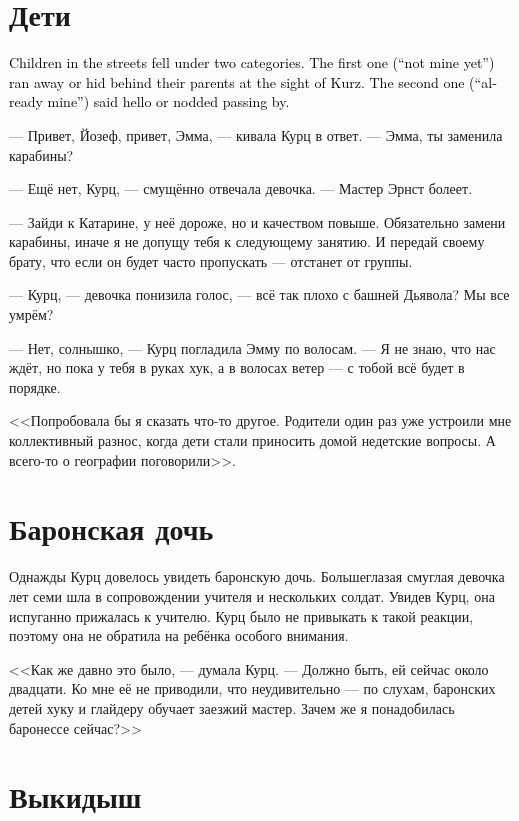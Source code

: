 \documentclass[a4paper,10pt,fleqn]{book}\usepackage{polyglossia}\setdefaultlanguage{english}\setotherlanguage{russian}\defaultfontfeatures{Ligatures=TeX,Mapping=tex-text}\usepackage{xcolor}\definecolor{lightgray}{HTML}{bbbbbb}\color{lightgray}\newcommand{\ml}[3]{\textcolor{black}{#3}}
\begin{document}
\section{Дети}

\ml{$0$}
{Встреченные на улице дети делились на две категории.}
{Children in the streets fell under two categories.}
\ml{$0$}
{Первая, <<ещё не мои>>, при виде Курц убегали или прятались за родителей.}
{The first one (``not mine yet'') ran away or hid behind their parents at the sight of Kurz.}
\ml{$0$}
{Вторая, <<уже мои>>, здоровались или кивали, проходя мимо.}
{The second one (``already mine'') said hello or nodded passing by.}

--- Привет, Йозеф, привет, Эмма, --- кивала Курц в ответ.
--- Эмма, ты заменила карабины?

--- Ещё нет, Курц, --- смущённо отвечала девочка.
--- Мастер Эрнст болеет.

--- Зайди к Катарине, у неё дороже, но и качеством повыше.
Обязательно замени карабины, иначе я не допущу тебя к следующему занятию.
И передай своему брату, что если он будет часто пропускать --- отстанет от группы.

--- Курц, --- девочка понизила голос, --- всё так плохо с башней Дьявола?
Мы все умрём?

--- Нет, солнышко, --- Курц погладила Эмму по волосам.
--- Я не знаю, что нас ждёт, но пока у тебя в руках хук, а в волосах ветер --- с тобой всё будет в порядке.

<<Попробовала бы я сказать что-то другое.
Родители один раз уже устроили мне коллективный разнос, когда дети стали приносить домой недетские вопросы.
А всего-то о географии поговорили>>.

\section{Баронская дочь}

Однажды Курц довелось увидеть баронскую дочь.
Большеглазая смуглая девочка лет семи шла в сопровождении учителя и нескольких солдат.
Увидев Курц, она испуганно прижалась к учителю.
Курц было не привыкать к такой реакции, поэтому она не обратила на ребёнка особого внимания.

<<Как же давно это было, --- думала Курц.
--- Должно быть, ей сейчас около двадцати.
Ко мне её не приводили, что неудивительно --- по слухам, баронских детей хуку и глайдеру обучает заезжий мастер.
Зачем же я понадобилась баронессе сейчас?>>

\section{Выкидыш}
\end{document}
